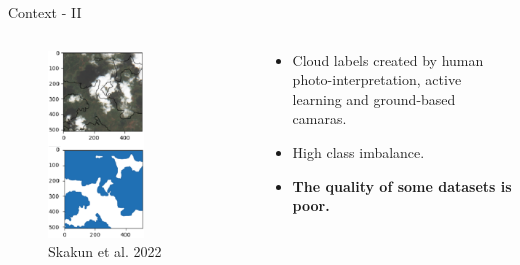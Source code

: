 \begin{frame}{Context - II}
	\begin{columns}
		\begin{column}{0.5\textwidth}
			\begin{figure}
				\includegraphics[width=0.6\textwidth]{images/contex_III.png}
				\caption[fig:introfig01]{Skakun et al. 2022}				
				\label{fig:introfig02}
			\end{figure}	
		\end{column}
		\begin{column}{0.5\textwidth}
			\begin{itemize}
				\item Cloud labels created by human photo-interpretation, active learning and ground-based camaras.
				\item High class imbalance.
				\item \textbf{The quality of some datasets is poor.}
			\end{itemize}
		\end{column}
	\end{columns}
\end{frame}




